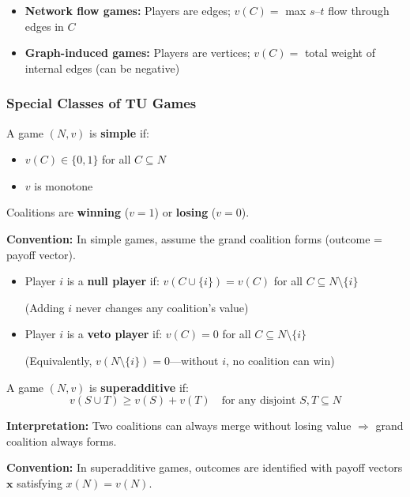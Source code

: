 \begin{defbox}
\begin{itemize}
  \item \textbf{Network flow games:} Players are edges; $v(C) =$ max $s$--$t$ flow through edges in $C$
  \item \textbf{Graph-induced games:} Players are vertices; $v(C) =$ total weight of internal edges (can be negative)
\end{itemize}
\end{defbox}

\bigseparator

\subsubsection{Special Classes of TU Games}

\begin{defbox}
A game $(N, v)$ is \textbf{simple} if:
\begin{itemize}
  \item $v(C) \in \{0, 1\}$ for all $C \subseteq N$
  \item $v$ is monotone
\end{itemize}

Coalitions are \textbf{winning} ($v = 1$) or \textbf{losing} ($v = 0$).

\textbf{Convention:} In simple games, assume the grand coalition forms (outcome = payoff vector).
\end{defbox}

\begin{defbox}
\begin{itemize}
  \item Player $i$ is a \textbf{null player} if: $v(C \cup \{i\}) = v(C)$ for all $C \subseteq N \setminus \{i\}$

  (Adding $i$ never changes any coalition's value)

  \item Player $i$ is a \textbf{veto player} if: $v(C) = 0$ for all $C \subseteq N \setminus \{i\}$

  (Equivalently, $v(N \setminus \{i\}) = 0$---without $i$, no coalition can win)
\end{itemize}
\end{defbox}

\separator

\begin{defbox}
A game $(N, v)$ is \textbf{superadditive} if:
\[
v(S \cup T) \geq v(S) + v(T) \quad \text{for any disjoint } S, T \subseteq N
\]

\textbf{Interpretation:} Two coalitions can always merge without losing value $\Rightarrow$ grand coalition always forms.

\textbf{Convention:} In superadditive games, outcomes are identified with payoff vectors $\mathbf{x}$ satisfying $x(N) = v(N)$.
\end{defbox}


